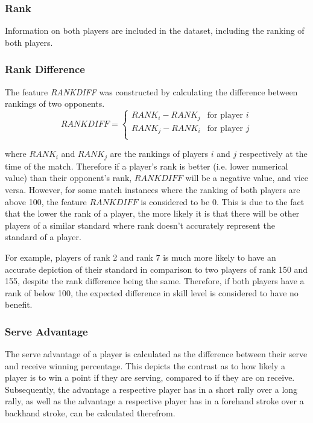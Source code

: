 \subsubsection{Rank} \label{rank}
Information on both players are included in the dataset, including the ranking of both players.

\subsubsection{Rank Difference} \label{rankdiff}
The feature \textit{RANKDIFF} was constructed by calculating the difference between rankings of two opponents.
\begin{equation}
    RANKDIFF = \begin{cases}
RANK_i - RANK_j &\text{for player $i$} \\
RANK_j - RANK_i &\text{for player $j$} \\
\end{cases}
\end{equation}

where $RANK_i$ and $RANK_j$ are the rankings of players $i$ and $j$ respectively at the time of the match. Therefore if a player's rank is better (i.e. lower numerical value) than their opponent's rank, $RANKDIFF$ will be a negative value, and vice versa. However, for some match instances where the ranking of both players are above 100, the feature $RANKDIFF$ is considered to be 0. This is due to the fact that the lower the rank of a player, the more likely it is that there will be other players of a similar standard where rank doesn't accurately represent the standard of a player.

For example, players of rank 2 and rank 7 is much more likely to have an accurate depiction of their standard in comparison to two players of rank 150 and 155, despite the rank difference being the same. Therefore, if both players have a rank of below 100, the expected difference in skill level is considered to have no benefit.

\subsubsection{Serve Advantage} \label{advantage}
The serve advantage of a player is calculated as the difference between their serve and receive winning percentage. This depicts the contrast as to how likely a player is to win a point if they are serving, compared to if they are on receive. Subsequently, the advantage a respective player has in a short rally over a long rally, as well as the advantage a respective player has in a forehand stroke over a backhand stroke, can be calculated therefrom.

